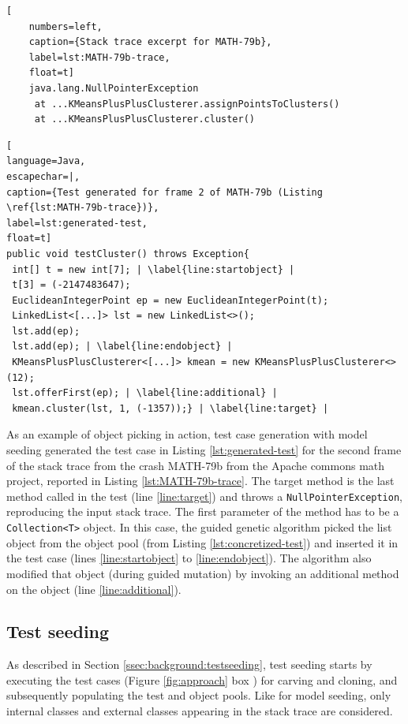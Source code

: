 \begin{lstlisting}[
    numbers=left,
    caption={Stack trace excerpt for MATH-79b},
    label=lst:MATH-79b-trace,
    float=t]
    java.lang.NullPointerException
     at ...KMeansPlusPlusClusterer.assignPointsToClusters()
     at ...KMeansPlusPlusClusterer.cluster()
    \end{lstlisting}

\begin{lstlisting}[
language=Java,
escapechar=|,
caption={Test generated for frame 2 of MATH-79b (Listing \ref{lst:MATH-79b-trace})},
label=lst:generated-test,
float=t]
public void testCluster() throws Exception{
 int[] t = new int[7]; | \label{line:startobject} |
 t[3] = (-2147483647);
 EuclideanIntegerPoint ep = new EuclideanIntegerPoint(t);
 LinkedList<[...]> lst = new LinkedList<>();
 lst.add(ep);
 lst.add(ep); | \label{line:endobject} |
 KMeansPlusPlusClusterer<[...]> kmean = new KMeansPlusPlusClusterer<>(12);
 lst.offerFirst(ep); | \label{line:additional} |
 kmean.cluster(lst, 1, (-1357));} | \label{line:target} |
\end{lstlisting}



As an example of object picking in action, test case generation with model seeding generated the test case in Listing \ref{lst:generated-test} for the second frame of the stack trace from the crash MATH-79b from the Apache commons math project, reported in Listing \ref{lst:MATH-79b-trace}.
%
The target method is the last method called in the test (line \ref{line:target}) and throws a \texttt{NullPointerException}, reproducing the input stack trace. The first parameter of the method has to be a \texttt{Collection<T>} object. In this case, the guided genetic algorithm picked the list object from the object pool (from Listing \ref{lst:concretized-test}) and inserted it in the test case (lines \ref{line:startobject} to \ref{line:endobject}). The algorithm also modified that object (during guided mutation) by invoking an additional method on the object (line \ref{line:additional}).

 \subsection{Test seeding}

As described in Section \ref{ssec:background:testseeding}, test seeding starts by executing the test cases (Figure \ref{fig:approach} box ) for carving and cloning, and subsequently populating the test and object pools. Like for model seeding, only internal classes and external classes appearing in the stack trace are considered.

